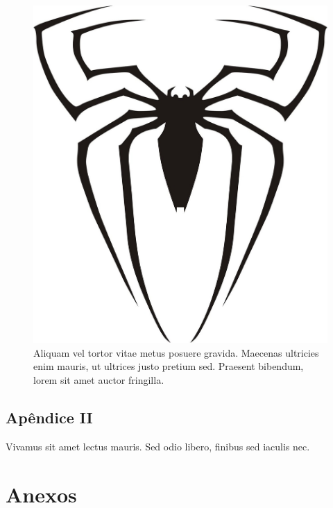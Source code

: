 \documentclass[book,A4paper,10pt,twoside,oldfontcommands]{memoir}\usepackage[]{graphicx}\usepackage[usenames,dvipsnames]{color}
\begin{document}
\begin{figure}[htb]
  \centering
  \includegraphics[scale=0.10]{figuras/spiderman.jpg}
  \caption{Aliquam vel tortor vitae metus posuere gravida. Maecenas
    ultricies enim mauris, ut ultrices justo pretium sed. Praesent
    bibendum, lorem sit amet auctor fringilla.}
  \label{fig:A1}
\end{figure}


\section*{Apêndice II}

Vivamus sit amet lectus mauris. Sed odio libero, finibus sed iaculis
nec.


\chapter*{Anexos}
\renewcommand{\thefigure}{anexo\arabic{figure}}
\renewcommand{\thetable}{anexo\arabic{table}}
\end{document}
